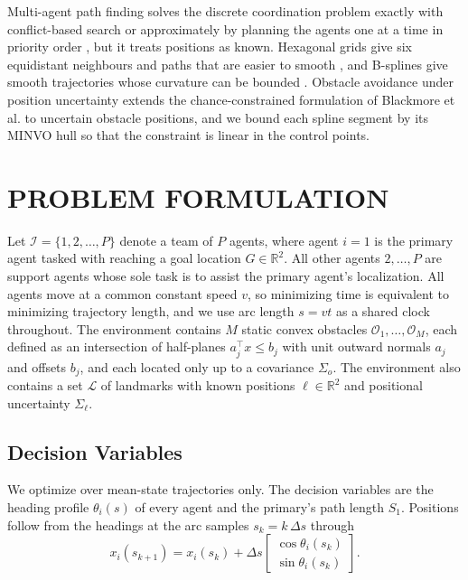\documentclass[letterpaper, 10 pt, conference]{ieeeconf}
\theoremstyle{remark}
\begin{document}
Multi-agent path finding solves the discrete coordination problem exactly
with conflict-based search \cite{sharon2015cbs} or approximately by planning
the agents one at a time in priority order
\cite{erdmann1987multiple,silver2005cooperative}, but it treats positions as
known. Hexagonal grids give six equidistant neighbours and paths that are
easier to smooth \cite{duszak2021hexgrid}, and B-splines give smooth
trajectories whose curvature can be bounded \cite{feng2024bsrrt}. Obstacle
avoidance under position uncertainty extends the chance-constrained
formulation of Blackmore et al. \cite{blackmore2011chance} to uncertain
obstacle positions, and we bound each spline segment by its MINVO hull
\cite{tordesillas2022minvo} so that the constraint is linear in the control
points.

\section{PROBLEM FORMULATION}
\label{sec:pf}
Let $\mathcal{I} = \{1,2,\dots,P\}$ denote a team of $P$ agents, where agent $i=1$
is the primary agent tasked with reaching a goal location $G\in\mathbb{R}^2$.
All other agents $2,\dots,P$ are support agents whose sole task is to assist the
primary agent's localization. All agents move at a common constant speed $v$,
so minimizing time is equivalent to minimizing trajectory length, and we use
arc length $s = vt$ as a shared clock throughout. The environment contains $M$
static convex obstacles $\mathcal{O}_1,\dots,\mathcal{O}_M$, each defined as an
intersection of half-planes $a_j^{\top}x \le b_j$ with unit outward normals
$a_j$ and offsets $b_j$, and each located only up to a covariance $\Sigma_o$.
The environment also contains a set $\mathcal{L}$ of landmarks with known
positions $\ell\in\mathbb{R}^2$ and positional uncertainty $\Sigma_\ell$.

\subsection{Decision Variables}

We optimize over mean-state trajectories only. The decision variables are the
heading profile $\theta_i(s)$ of every agent and the primary's path length
$S_1$. Positions follow from the headings at the arc samples
$s_k = k\,\Delta s$ through
\begin{equation}
  x_i(s_{k+1}) = x_i(s_k) + \Delta s
  \begin{bmatrix} \cos\theta_i(s_k) \\ \sin\theta_i(s_k) \end{bmatrix}.
  \label{eq:dyn}
\end{equation}
\end{document}
